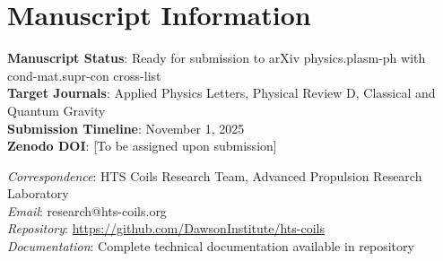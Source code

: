 \documentclass[12pt,a4paper]{article}
\begin{document}
\section*{Manuscript Information}

\textbf{Manuscript Status}: Ready for submission to arXiv physics.plasm-ph with cond-mat.supr-con cross-list\\
\textbf{Target Journals}: Applied Physics Letters, Physical Review D, Classical and Quantum Gravity\\
\textbf{Submission Timeline}: November 1, 2025\\
\textbf{Zenodo DOI}: [To be assigned upon submission]

\textit{Correspondence}: HTS Coils Research Team, Advanced Propulsion Research Laboratory\\
\textit{Email}: research@hts-coils.org\\
\textit{Repository}: \url{https://github.com/DawsonInstitute/hts-coils}\\
\textit{Documentation}: Complete technical documentation available in repository
\end{document}
